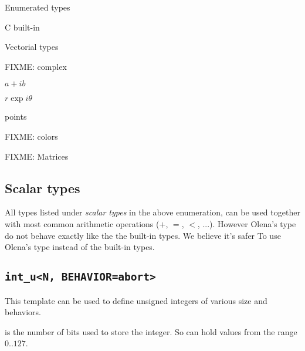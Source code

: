 \begin{list}{--}{}
\item Enumerated types
  \begin{list}{--}{}
  \item C built-in 
  \item {}
  \item {}
  \end{list}
\item Vectorial types
  \begin{list}{--}{}
  \item FIXME: complex
    \begin{list}{--}{}
    \item $a+ib$
    \item $r\exp{i\theta}$
    \end{list}
  \item points
    \begin{list}{--}{}
    \item {}
    \item {}
    \item {}
    \end{list}
  \item {}
  \item FIXME: colors
  \end{list}
\item FIXME: Matrices
\end{list}

\subsection{Scalar types}

All types listed under \emph{scalar types} in the above enumeration,
can be used together with most common arithmetic operations ($+$, $=$,
$<$, ...).  However Olena's type do not behave exactly like the
the built-in types.  We believe it's safer To
use Olena's type instead of the built-in types.

\subsection{\lstinline$int_u<N, BEHAVIOR=abort>$}

This template can be used to define unsigned integers of various size
and behaviors.

 is the number of bits used to store the
integer.  So  can hold values from the range $0..127$.

